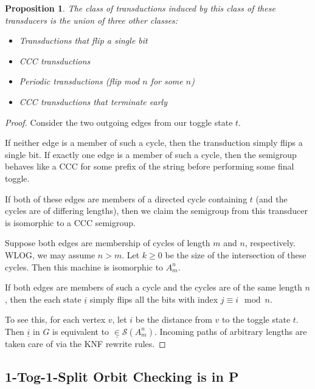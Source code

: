 \documentclass{article}
\newtheorem{proposition}{Proposition}
\newcommand{\0}{\underline{0}}
\newcommand{\1}{\underline{1}}
\newcommand{\2}{\underline{2}}
\renewcommand{\S}{\mathcal{S}}
\begin{document}
\begin{proposition}
The class of transductions induced by this class of these transducers is the union of three other classes:
\begin{itemize}
\item Transductions that flip a single bit
\item CCC transductions
\item Periodic transductions (flip mod $n$ for some $n$)
\item CCC transductions that terminate early
\end{itemize}
\end{proposition}
\begin{proof}
Consider the two outgoing edges from our toggle state $t$.

If neither edge is a member of such a cycle, then the transduction simply flips a single bit. If exactly one edge is a member of such a cycle, then the semigroup behaves like a CCC for some prefix of the string before performing some final toggle.

If both of these edges are members of a directed cycle containing $t$ (and the cycles are of differing lengths), then we claim the semigroup from this transducer is isomorphic to a CCC semigroup.

Suppose both edges are membership of cycles of length $m$ and $n$, respectively. WLOG, we may assume $n > m$. Let $k \geq 0$ be the size of the intersection of these cycles. Then this machine is isomorphic to $A^n_m$.

If both edges are members of such a cycle and the cycles are of the same length $n$, then the each state $\underline{i}$ simply flips all the bits with index $j \equiv i \mod{n}$.

To see this, for each vertex $v$, let $i$ be the distance from $v$ to the toggle state $t$. Then $\underline{i}$ in $G$ is equivalent to $\underline \in \S(A^n_m)$. Incoming paths of arbitrary lengths are taken care of via the KNF rewrite rules.
\end{proof}

\subsection*{1-Tog-1-Split Orbit Checking is in P}
\end{document}
